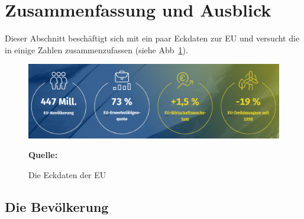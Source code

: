 \section{Zusammenfassung und Ausblick}\label{sec:02_05_zusammenfassung}

Dieser Abschnitt beschäftigt sich mit ein paar Eckdaten zur EU und versucht die in einige Zahlen zusammenzufassen (siehe Abb~\ref{fig:euroEckDaten}).
\noindent
\begin{figure}[H]
\centering
    \includegraphics[width=.6\textwidth]{images/EU_Eckdaten.PNG}
    \caption{Die Eckdaten der EU}
    \textbf{Quelle: }  \cite{euroInZahlen}
    \label{fig:euroEckDaten}
\end{figure}

\subsection{Die Bevölkerung}\label{subsec:EuroBevoelkerung}

